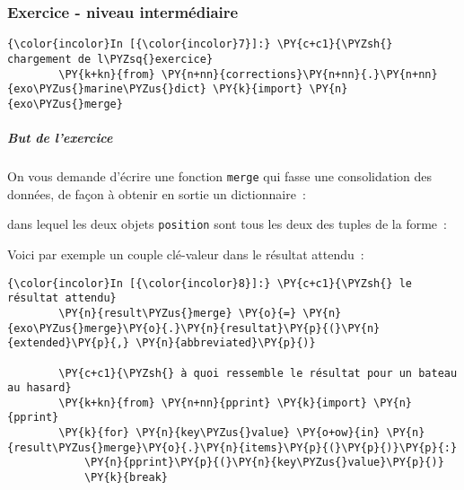     \hypertarget{exercice---niveau-intermuxe9diaire}{%
\subsubsection{Exercice - niveau
intermédiaire}\label{exercice---niveau-intermuxe9diaire}}

    \begin{Verbatim}[commandchars=\\\{\}]
{\color{incolor}In [{\color{incolor}7}]:} \PY{c+c1}{\PYZsh{} chargement de l\PYZsq{}exercice}
        \PY{k+kn}{from} \PY{n+nn}{corrections}\PY{n+nn}{.}\PY{n+nn}{exo\PYZus{}marine\PYZus{}dict} \PY{k}{import} \PY{n}{exo\PYZus{}merge}
\end{Verbatim}


    \hypertarget{but-de-lexercice}{%
\subparagraph{But de l'exercice}\label{but-de-lexercice}}

    On vous demande d'écrire une fonction \texttt{merge} qui fasse une
consolidation des données, de façon à obtenir en sortie un
dictionnaire~:

\begin{Shaded}
\begin{Highlighting}[]
 \OperatorTok{->}
\end{Highlighting}
\end{Shaded}

dans lequel les deux objets \texttt{position} sont tous les deux des
tuples de la forme~:

\begin{Shaded}
\begin{Highlighting}[]
\end{Highlighting}
\end{Shaded}

    Voici par exemple un couple clé-valeur dans le résultat attendu~:

    \begin{Verbatim}[commandchars=\\\{\}]
{\color{incolor}In [{\color{incolor}8}]:} \PY{c+c1}{\PYZsh{} le résultat attendu}
        \PY{n}{result\PYZus{}merge} \PY{o}{=} \PY{n}{exo\PYZus{}merge}\PY{o}{.}\PY{n}{resultat}\PY{p}{(}\PY{n}{extended}\PY{p}{,} \PY{n}{abbreviated}\PY{p}{)}
        
        \PY{c+c1}{\PYZsh{} à quoi ressemble le résultat pour un bateau au hasard}
        \PY{k+kn}{from} \PY{n+nn}{pprint} \PY{k}{import} \PY{n}{pprint}
        \PY{k}{for} \PY{n}{key\PYZus{}value} \PY{o+ow}{in} \PY{n}{result\PYZus{}merge}\PY{o}{.}\PY{n}{items}\PY{p}{(}\PY{p}{)}\PY{p}{:}
            \PY{n}{pprint}\PY{p}{(}\PY{n}{key\PYZus{}value}\PY{p}{)}
            \PY{k}{break}
\end{Verbatim}


